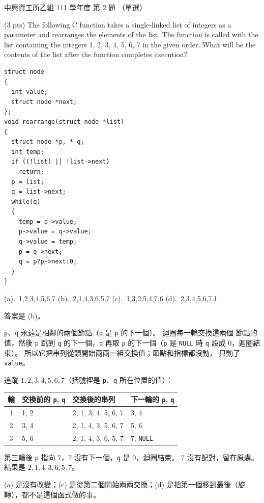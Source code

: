 \begin{pastexam}[label={px:nchu-111-is-02}]{中興資工所乙組 111 學年度 第 2 題}
（單選）

(3 pts) The following C function takes a single-linked list of integers as a parameter and rearranges the
elements of the list. The function is called with the list containing the integers 1, 2, 3, 4, 5, 6, 7 in the
given order. What will be the contents of the list after the function completes execution?
\begin{verbatim}
struct node
{
  int value;
  struct node *next;
};
void rearrange(struct node *list)
{
  struct node *p, * q;
  int temp;
  if ((!list) || !list->next)
    return;
  p = list;
  q = list->next;
  while(q)
  {
    temp = p->value;
    p->value = q->value;
    q->value = temp;
    p = q->next;
    q = p?p->next:0;
  }
}
\end{verbatim}
(a).~1,2,3,4,5,6,7 \qquad (b).~2,1,4,3,6,5,7 \qquad (c).~1,3,2,5,4,7,6 \qquad (d).~2,3,4,5,6,7,1
\end{pastexam}

\begin{pastsoln}
答案是 (b)。

\texttt{p}、\texttt{q} 永遠是相鄰的兩個節點（\texttt{q} 是 \texttt{p} 的下一個）。 迴圈每一輪交換這兩個
節點的值，然後 \texttt{p} 跳到 \texttt{q} 的下一個，\texttt{q} 再取 \texttt{p} 的下一個（\texttt{p} 是
\texttt{NULL} 時 \texttt{q} 設成 $0$，迴圈結束）。 所以它把串列從頭開始兩兩一組交換值；節點和指標都沒動，
只動了 \texttt{value}。

追蹤 $1, 2, 3, 4, 5, 6, 7$（括號裡是 \texttt{p}、\texttt{q} 所在位置的值）：
\begin{center}
\small
\begin{tabular}{clll}
\toprule
輪 & 交換前的 \texttt{p}, \texttt{q} & 交換後的串列 & 下一輪的 \texttt{p}, \texttt{q} \\
\midrule
1 & 1, 2 & 2, 1, 3, 4, 5, 6, 7 & 3, 4 \\
2 & 3, 4 & 2, 1, 4, 3, 5, 6, 7 & 5, 6 \\
3 & 5, 6 & 2, 1, 4, 3, 6, 5, 7 & 7, \texttt{NULL} \\
\bottomrule
\end{tabular}
\end{center}
第三輪後 \texttt{p} 指向 $7$，$7$ 沒有下一個，\texttt{q} 是 $0$，迴圈結束。 $7$ 沒有配對，留在原處。
結果是 $2, 1, 4, 3, 6, 5, 7$。

(a) 是沒有改變；(c) 是從第二個開始兩兩交換；(d) 是把第一個移到最後（旋轉），都不是這個函式做的事。
\end{pastsoln}
